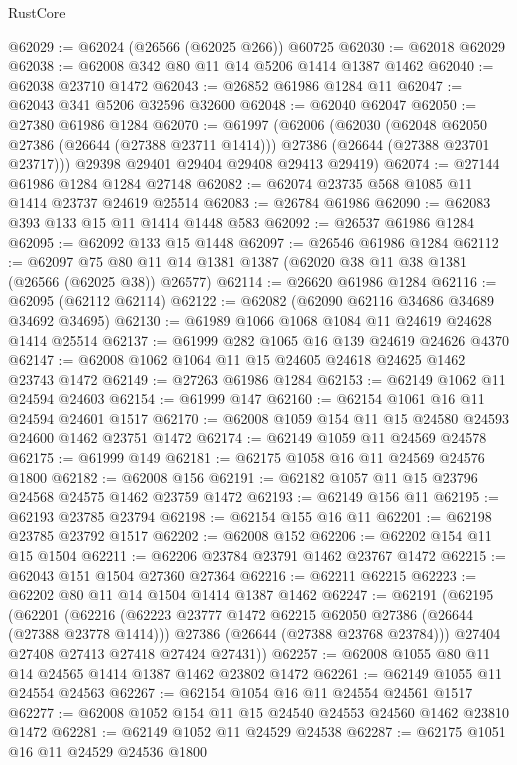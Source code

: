 \begin{lexlean}{RustCore}
\begin{coremodule}
@62029 := @62024 (@26566 (@62025 @266)) @60725
@62030 := @62018 @62029
@62038 := @62008 @342 @80 @11 @14 @5206 @1414 @1387 @1462
@62040 := @62038 @23710 @1472
@62043 := @26852 @61986 @1284 @11
@62047 := @62043 @341 @5206 @32596 @32600
@62048 := @62040 @62047
@62050 := @27380 @61986 @1284
@62070 := @61997
    (@62006
      (@62030
        (@62048 @62050 @27386 (@26644 (@27388 @23711 @1414)))
        @27386
        (@26644 (@27388 @23701 @23717)))
      @29398
      @29401
      @29404
      @29408
      @29413
      @29419)
@62074 := @27144 @61986 @1284 @1284 @27148
@62082 := @62074 @23735 @568 @1085 @11 @1414 @23737 @24619 @25514
@62083 := @26784 @61986
@62090 := @62083 @393 @133 @15 @11 @1414 @1448 @583
@62092 := @26537 @61986 @1284
@62095 := @62092 @133 @15 @1448
@62097 := @26546 @61986 @1284
@62112 := @62097 @75 @80 @11 @14 @1381 @1387 (@62020 @38 @11 @38 @1381 (@26566 (@62025 @38)) @26577)
@62114 := @26620 @61986 @1284
@62116 := @62095 (@62112 @62114)
@62122 := @62082 (@62090 @62116 @34686 @34689 @34692 @34695)
@62130 := @61989 @1066 @1068 @1084 @11 @24619 @24628 @1414 @25514
@62137 := @61999 @282 @1065 @16 @139 @24619 @24626 @4370
@62147 := @62008 @1062 @1064 @11 @15 @24605 @24618 @24625 @1462 @23743 @1472
@62149 := @27263 @61986 @1284
@62153 := @62149 @1062 @11 @24594 @24603
@62154 := @61999 @147
@62160 := @62154 @1061 @16 @11 @24594 @24601 @1517
@62170 := @62008 @1059 @154 @11 @15 @24580 @24593 @24600 @1462 @23751 @1472
@62174 := @62149 @1059 @11 @24569 @24578
@62175 := @61999 @149
@62181 := @62175 @1058 @16 @11 @24569 @24576 @1800
@62182 := @62008 @156
@62191 := @62182 @1057 @11 @15 @23796 @24568 @24575 @1462 @23759 @1472
@62193 := @62149 @156 @11
@62195 := @62193 @23785 @23794
@62198 := @62154 @155 @16 @11
@62201 := @62198 @23785 @23792 @1517
@62202 := @62008 @152
@62206 := @62202 @154 @11 @15 @1504
@62211 := @62206 @23784 @23791 @1462 @23767 @1472
@62215 := @62043 @151 @1504 @27360 @27364
@62216 := @62211 @62215
@62223 := @62202 @80 @11 @14 @1504 @1414 @1387 @1462
@62247 := @62191
    (@62195
      (@62201
        (@62216
          (@62223 @23777 @1472 @62215 @62050 @27386 (@26644 (@27388 @23778 @1414)))
          @27386
          (@26644 (@27388 @23768 @23784)))
        @27404
        @27408
        @27413
        @27418
        @27424
        @27431))
@62257 := @62008 @1055 @80 @11 @14 @24565 @1414 @1387 @1462 @23802 @1472
@62261 := @62149 @1055 @11 @24554 @24563
@62267 := @62154 @1054 @16 @11 @24554 @24561 @1517
@62277 := @62008 @1052 @154 @11 @15 @24540 @24553 @24560 @1462 @23810 @1472
@62281 := @62149 @1052 @11 @24529 @24538
@62287 := @62175 @1051 @16 @11 @24529 @24536 @1800

\end{coremodule}
\end{lexlean}
